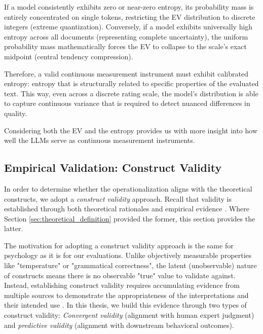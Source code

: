 If a model consistently exhibits zero or near-zero entropy, its probability mass is entirely concentrated on single tokens, restricting the EV distribution to discrete integers (extreme quantization). Conversely, if a model exhibits universally high entropy across all documents (representing complete uncertainty), the uniform probability mass mathematically forces the EV to collapse to the scale's exact midpoint (central tendency compression). 

Therefore, a valid continuous measurement instrument must exhibit calibrated entropy: entropy that is structurally related to specific properties of the evaluated text. This way, even across a discrete rating scale, the model's distribution is able to capture continuous variance that is required to detect nuanced differences in quality. 

Considering both the EV and the entropy provides us with more insight into how well the LLMs serve as continuous measurement instruments. 



\subsection{Empirical Validation: Construct Validity}\label{sec:empirical_validation}


In order to determine whether the operationalization aligns with the theoretical constructs, we adopt a \textit{construct validity} approach. Recall that validity is established through both theoretical rationales and empirical evidence \citep{messick1989meaning}. Where Section \ref{sec:theoretical_definition} provided the former, this section provides the latter.

The motivation for adopting a construct validity approach is the same for psychology as it is for our evaluations. Unlike objectively measurable properties like "temperature" or "grammatical correctness", the latent (unobservable) nature of constructs means there is no observable "true" value to validate against. Instead, establishing construct validity requires accumulating evidence from multiple sources to demonstrate the appropriateness of the interpretations and their intended use \citep{messick1989meaning}. In this thesis, we build this evidence through two types of construct validity: \textit{Convergent validity} (alignment with human expert judgment) and \textit{predictive validity} (alignment with downstream behavioral outcomes). 


